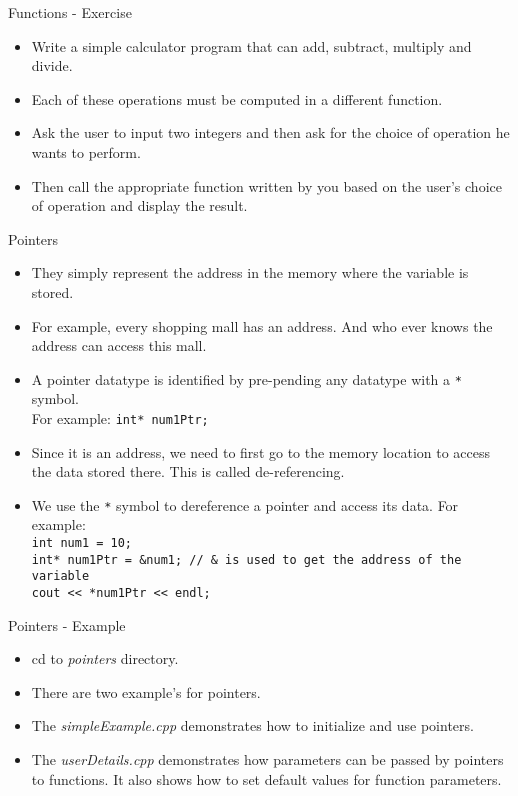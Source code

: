 \documentclass[aspectratio=169]{beamer}
\begin{document}
\begin{frame}[fragile]{Functions - Exercise}
    \begin{itemize}
        \item Write a simple calculator program that can add, subtract, multiply and divide.
        \item Each of these operations must be computed in a different function.
        \item Ask the user to input two integers and then ask for the choice of operation he wants to perform.
        \item Then call the appropriate function written by you based on the user's choice of operation and display the result.
    \end{itemize}
\end{frame}

\begin{frame}[fragile]{Pointers}
    \begin{itemize}
        \item They simply represent the address in the memory where the variable is stored.
        \item For example, every shopping mall has an address. And who ever knows the address can access this mall.
        \item A pointer datatype is identified by pre-pending any datatype with a \verb|*| symbol. \\For example: \verb|int* num1Ptr;|
        \item Since it is an address, we need to first go to the memory location to access the data stored there. This is called de-referencing.
        \item We use the \verb|*| symbol to dereference a pointer and access its data. For example:\\ \verb|int num1 = 10;| \\ \verb|int* num1Ptr = &num1; // & is used to get the address of the variable| \\ \verb|cout << *num1Ptr << endl;|
    \end{itemize}
\end{frame}

\begin{frame}[fragile]{Pointers - Example}
    \begin{itemize}
        \item cd to \textit{pointers} directory.
        \item There are two example's for pointers.
        \item The \textit{simpleExample.cpp} demonstrates how to initialize and use pointers.
        \item The \textit{userDetails.cpp} demonstrates how parameters can be passed by pointers to functions. It also shows how to set default values for function parameters.
    \end{itemize}
\end{frame}
\end{document}
